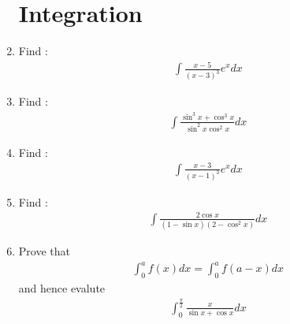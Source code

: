 \documentclass[2pt,-letter paper]{article}
\providecommand{\brak}[1]{\ensuremath{\left(#1\right)}}
\begin{document}
\begin{enumerate}
\section{Integration}
		\item Find : 
	\begin{align*}
		{\int {\frac{x-5}{\brak{x-3}^3}}e^{x}dx}
	\end{align*}
\item Find :
	\begin{align*}
		{\int{\frac{{\sin^{3}}{x} +{\cos^{3}}{x}}{{\sin^{2}}{x}{\cos^{2}}{x}}}dx} 
	\end{align*}
\item Find :                                       \begin{align*}                                           {\int {\frac{x-3}{\brak{x-1}^{3}}}e^{x}dx}   \end{align*}
\item Find :
\begin{align*}
	{\int{\frac{2\cos x}{\brak{1-\sin x}\brak{2-\cos^{2} x}}}dx}
\end{align*} 
\item Prove that
	\begin{align*}
	\int_{0}^{a} f\brak{x}dx=\int_{0}^{a} f\brak{a-x}dx
	\end{align*}
		and hence evalute
		\begin{align*}
		\int_{0}^{\frac{\pi}{2}} \frac{x}{{\sin x}+ {\cos x}}dx
		\end{align*}

\end{enumerate}
\end{document}
